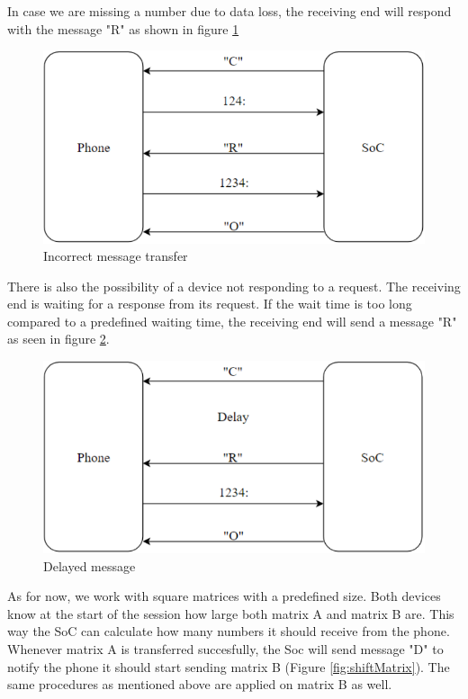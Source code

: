 \documentclass[a4paper, 11pt]{report}
\begin{document}
In case we are missing a number due to data loss, the receiving end will respond with the message "R" as shown in figure \ref{fig:incorrectMessage}

\begin{figure}[ht]
\centering
\includegraphics[scale=0.7]{images/IncorrectMsg.pdf}
\caption{Incorrect message transfer}\label{fig:incorrectMessage}
\end{figure}

There is also the possibility of a device not responding to a request. The receiving end is waiting for a response from its request. If the wait time is too long compared to a predefined waiting time, the receiving end will send a message "R" as seen in figure \ref{fig:delayedMessage}.

\begin{figure}[ht]
\centering
\includegraphics[scale=0.7]{images/DelayedMsg.pdf}
\caption{Delayed message}\label{fig:delayedMessage}
\end{figure}

As for now, we work with square matrices with a predefined size. Both devices know at the start of the session how large both matrix A and matrix B are. This way the SoC can calculate how many numbers it should receive from the phone. Whenever matrix A is transferred succesfully, the Soc will send message "D" to notify the phone it should start sending matrix B (Figure \ref{fig:shiftMatrix}). The same procedures as mentioned above are applied on matrix B as well.
\end{document}
